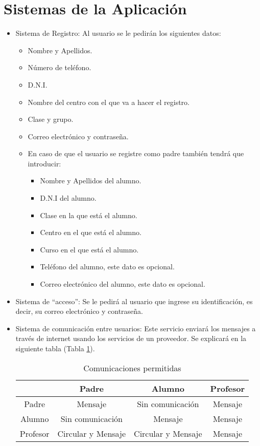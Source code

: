 	\section{Sistemas de la Aplicación}
		\begin{itemize}
			\item Sistema de Registro: Al usuario se le pedirán los siguientes datos:
			\begin{itemize}
				\item Nombre y Apellidos.
				\item Número de teléfono.
				\item D.N.I.
				\item Nombre del centro con el que va a hacer el registro.
				\item Clase y grupo.
				\item Correo electrónico y contraseña.
				\item En caso de que el usuario se registre como padre también tendrá que introducir:
				\begin{itemize}
					\item Nombre y Apellidos del alumno.
					\item D.N.I del alumno.
					\item Clase en la que está el alumno.
					\item Centro en el que está el alumno.
					\item Curso en el que está el alumno.
					\item Teléfono del alumno, este dato es opcional.
					\item Correo electrónico del alumno, este dato es opcional.
				\end{itemize}
			\end{itemize}
			\item Sistema de ``acceso'': Se le pedirá al usuario que ingrese su identificación, es decir, su correo electrónico y contraseña.
			\item Sistema de comunicación entre usuarios: Este servicio enviará los mensajes a través de internet usando los servicios de un proveedor. Se explicará en la siguiente tabla (Tabla \ref{table:communications}). %
			
			\begin{table} [!hbt]
			\begin{center}
			\begin{tabular}{|| c | c | c | c ||}
				\hline
				\hline
				& Padre & Alumno & Profesor \\
				\hline
				Padre & Mensaje & Sin comunicación & Mensaje \\
				\hline
				Alumno & Sin comunicación & Mensaje & Mensaje \\
				\hline
				Profesor & Circular y Mensaje & Circular y Mensaje & Mensaje \\
				\hline
				\hline
			\end{tabular}
			\caption{Comunicaciones permitidas}
			\label{table:communications}
			\end{center}
			\end{table}
			

\end{itemize}
